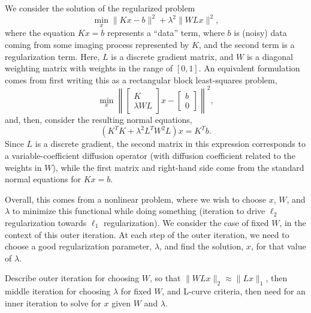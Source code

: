 
We consider the solution of the regularized problem
\begin{equation}
\label{eq:regularized}
\min_{x} \|Kx-b\|^2 + \lambda^2\|WLx\|^2,
\end{equation}
where the equation $Kx=b$ represents a ``data'' term, where $b$ is
(noisy) data coming from some imaging process represented by $K$, and
the second term is a regularization term.  Here, $L$ is a discrete
gradient matrix, and $W$ is a diagonal weighting matrix with weights
in the range of $[0,1]$.  An equivalent formulation comes from first
writing this as a rectangular block least-squares problem,
\begin{equation}
  \label{eq:block-ls}
  \min_{x} \left\| \left[\begin{array}{c} K \\ \lambda
                           WL\end{array}\right]x - \left[\begin{array}{c} b \\ 0 \end{array}\right]\right\|^2,
\end{equation}
and, then, consider the resulting normal equations,
\begin{equation}
\label{eq:normal}
\left(K^TK + \lambda^2 L^TW^2L\right)x = K^Tb.
\end{equation}
Since $L$ is a discrete gradient, the second matrix in this expression
corresponds to a variable-coefficient diffusion operator (with
diffusion coefficient related to the weights in $W$), while the first
matrix and right-hand side come from the standard normal equations for
$Kx=b$.

Overall, this comes from a nonlinear problem, where we wish to choose
$x$, $W$, and $\lambda$ to minimize this functional while doing
something (iteration to drive $\ell_2$ regularization towards $\ell_1$
regularization).  We consider the case of fixed $W$, in the context of
this outer iteration.  At each step of the outer iteration, we need to
choose a good regularization parameter, $\lambda$, and find the
solution, $x$, for that value of $\lambda$.

Describe outer iteration for choosing $W$, so that $\|WLx\|_2 \approx
\|Lx\|_1$, then middle iteration for choosing $\lambda$ for fixed $W$,
and L-curve criteria, then need for an inner iteration to solve for
$x$ given $W$ and $\lambda$.
